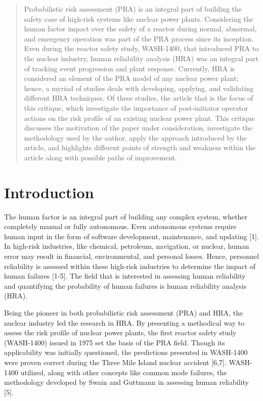 \documentclass[11pt, letterpaper]{article}
\begin{document}
\maketitle

\begin{abstract}
\noindent Probabilistic risk assessment (PRA) is an integral part of building the safety case of high-risk systems like nuclear power plants. Considering the human factor impact over the safety of a reactor during normal, abnormal, and emergency operation was part of the PRA process since its inception. Even during the reactor safety study, WASH-1400, that introduced PRA to the nuclear industry, human reliability analysis (HRA) was an integral part of tracking event progression and plant response. Currently, HRA is considered an element of the PRA model of any nuclear power plant; hence, a myriad of studies deals with developing, applying, and validating different HRA techniques. Of these studies, the article that is the focus of this critique, which investigate the importance of post-initiator operator actions on the risk profile of an existing nuclear power plant. This critique discusses the motivation of the paper under consideration, investigate the methodology used by the author, apply the approach introduced by the article, and highlights different points of strength and weakness within the article along with possible paths of improvement.
\end{abstract}

\section{Introduction}
The human factor is an integral part of building any complex system, whether completely manual or fully autonomous. Even autonomous systems require human input in the form of software development, maintenance, and updating [1]. In high-risk industries, like chemical, petroleum, navigation, or nuclear, human error may result in financial, environmental, and personal losses. Hence, personnel reliability is assessed within these high-risk industries to determine the impact of human failures [1-5]. The field that is interested in assessing human reliability and quantifying the probability of human failures is human reliability analysis (HRA).

Being the pioneer in both probabilistic risk assessment (PRA) and HRA, the nuclear industry led the research in HRA. By presenting a methodical way to assess the risk profile of nuclear power plants, the first reactor safety study (WASH-1400) issued in 1975 set the basis of the PRA field. Though its applicability was initially questioned, the predictions presented in WASH-1400 were proven correct during the Three Mile Island nuclear accident [6,7]. WASH-1400 utilized, along with other concepts like common mode failures, the methodology developed by Swain and Guttmann in assessing human reliability [5].
\end{document}
